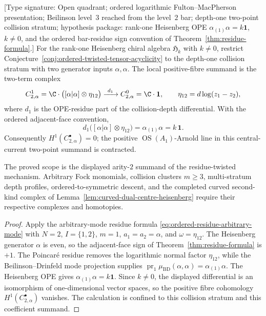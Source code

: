 \begin{proposition}
\label{prop:heisenberg-two-point-residue-twisted-acyclicity}
\textup{[Type signature: Open quadrant; ordered logarithmic
Fulton--MacPherson presentation; Beilinson level~$3$ reached from the
level~$2$ bar; depth-one two-point collision stratum; hypothesis
package: rank-one Heisenberg OPE
\(\alpha_{(1)}\alpha=k\mathbf1\), \(k\neq0\), and the ordered
bar-residue sign convention of Theorem~\ref{thm:residue-formula}.]}
For the rank-one Heisenberg chiral algebra \(\mathfrak H_k\) with
\(k\neq0\), restrict
Conjecture~\ref{conj:ordered-twisted-tensor-acyclicity} to the
depth-one collision stratum with two generator inputs
\(\alpha,\alpha\).  The local positive-fibre summand is the two-term
complex
\[
 C^1_{2,\alpha}
 =\C\cdot\bigl([\alpha|\alpha]\otimes\eta_{12}\bigr)
 \xrightarrow{\ d_1\ }
 C^0_{2,\alpha}
 =\C\cdot\mathbf1,
 \qquad
 \eta_{12}=d\log(z_1-z_2),
\]
where \(d_1\) is the OPE-residue part of the collision-depth
differential.  With the ordered adjacent-face convention,
\[
 d_1\bigl([\alpha|\alpha]\otimes\eta_{12}\bigr)
 =
 \alpha_{(1)}\alpha
 =
 k\,\mathbf1.
\]
Consequently \(H^1(C^\bullet_{2,\alpha})=0\); the positive
\(\operatorname{OS}(A_1)\)-Arnold line in this central-current
two-point summand is contracted.

The proved scope is the displayed arity-\(2\) summand of the
residue-twisted mechanism.  Arbitrary Fock monomials, collision
clusters \(m\ge3\), multi-stratum depth profiles, ordered-to-symmetric
descent, and the completed curved second-kind complex of
Lemma~\ref{lem:curved-dual-centre-heisenberg} require their respective
complexes and homotopies.
\end{proposition}

\begin{proof}
Apply the arbitrary-mode residue formula
\eqref{eq:ordered-residue-arbitrary-mode} with \(N=2\),
\(I=\{1,2\}\), \(m=1\), \(a_1=a_2=\alpha\), and
\(\omega=\eta_{12}\).  The Heisenberg generator \(\alpha\) is even, so
the adjacent-face sign of Theorem~\ref{thm:residue-formula} is \(+1\).
The Poincar\'e residue removes the logarithmic normal factor
\(\eta_{12}\), while the Beilinson--Drinfeld mode projection supplies
\(\operatorname{pr}_1\mu_{\mathrm{BD}}(\alpha,\alpha)
=\alpha_{(1)}\alpha\).  The Heisenberg OPE gives
\(\alpha_{(1)}\alpha=k\mathbf1\).  Since \(k\neq0\), the displayed
differential is an isomorphism of one-dimensional vector spaces, so
the positive fibre cohomology \(H^1(C^\bullet_{2,\alpha})\) vanishes.
The calculation is confined to this collision stratum and this
coefficient summand.
\end{proof}

